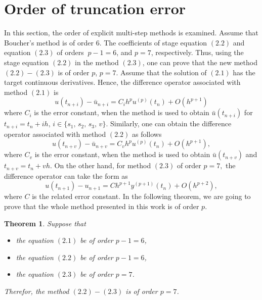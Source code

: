 \documentclass[11pt,twoside, final]{amsart}
\newtheorem{theorem}{Theorem}[section]
\begin{document}
\section{\textbf{Order of truncation error}}
In this section, the order of explicit multi-step methods is examined. Assume that Boucher's method is of order 6. 
The coefficients of stage equation $(2.2)$   and equation $(2.3)$  of orders $\ p-1=6$,    and  $p=7$,  respectively. 
Thus, using the stage equation $(2.2)$ in the method $(2.3)$,   one can prove that
the new method $(2.2)-(2.3)$ is of order $p$,  $p=7$. Assume that the
solution of $(2.1)$ has the target continuous  derivatives. Hence, the difference operator associated with method $(2.1)$ is
\begin{equation}\label{3.1}
u(t_{n+i}) -\bar{u}_{n+i}=C_{i}h^{p}u^{(p)}(t_{n})+O(h^{p+1})
\end{equation}
where  $C_{i}$ is the error constant, when the method is used to obtain   $\bar{u}(t_{n+i})$ for $t_{n+i}=t_{n}+i h,\,i\in\{s_{1},\, s_{2},\,s_{3},\,v\}$.
Similarly, one can obtain the difference operator associated with method $(2.2)$ as  follows
\begin{equation}\label{3.2}
 u(t_{n+v}) -\bar{u}_{n+v}=C_{v}h^{p}u^{(p)}(t_{n})+O(h^{p+1}),
\end{equation}
where   $C_v$ is the error constant,   when the method is used to obtain  $\bar{u}(t_{n+v})$ and $t_{n+v}=t_{n}+vh$.
On the other hand, for method $(2.3)$ of order $p=7,$
the difference operator can take the form as
\begin{equation}\label{3.3}
 u(t_{n+1}) -u_{n+1}=Ch^{p+1}y^{(p+1)}(t_{n})+O(h^{p+2}),
\end{equation}
where $C$ is the  related error constant. In the following theorem, we are going to prove that the whole method presented in this work is of order $p.$
 \begin{theorem}\label{thm1}
 Suppose  that
\begin{itemize}
  \item the equation $(2.1)$ be of order $p-1=6$,
  \item  the equation $(2.2)$ be of order $p-1=6$,
\item  the equation $(2.3)$ be of order $p=7$.
\end{itemize}
Therefor, the   method $(2.2)-(2.3)$ is of order   $p=7$.
\end{theorem}
\end{document}
